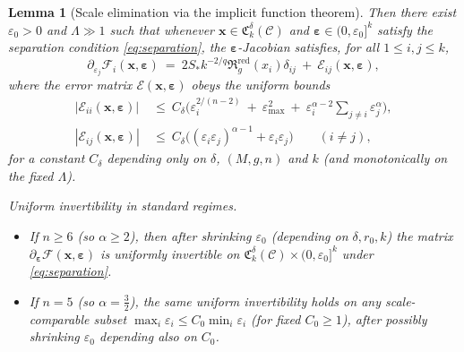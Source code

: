 \documentclass[11pt,reqno,a4paper]{amsart}
\numberwithin{equation}{section}
\theoremstyle{plain}
\newtheorem{lemma}[theorem]{Lemma}
\theoremstyle{remark}
\theoremstyle{plain}
\begin{document}
\begin{lemma}[Scale elimination via the implicit function theorem]
Then there exist $\varepsilon_0>0$ and $\Lambda\gg1$ such that whenever
$\mathbf x\in\mathfrak C_k^\delta(\mathcal C)$ and $\boldsymbol\varepsilon\in(0,\varepsilon_0]^k$ satisfy the
separation condition \eqref{eq:separation}, the $\boldsymbol\varepsilon$-Jacobian satisfies, for all $1\le i,j\le k$,
\begin{equation}\label{eq:scale-Jacobian-structure}
\partial_{\varepsilon_j}\mathcal F_i(\mathbf x,\boldsymbol\varepsilon)
\ =\ 2S_\ast k^{-2/q}\mathfrak R_g^{\mathrm{red}}(x_i)\delta_{ij}\ +\ \mathcal E_{ij}(\mathbf x,\boldsymbol\varepsilon),
\end{equation}
where the error matrix $\mathcal E(\mathbf x,\boldsymbol\varepsilon)$ obeys the uniform bounds
\begin{align}
|\mathcal E_{ii}(\mathbf x,\boldsymbol\varepsilon)|
&\ \le\ C_\delta\Big(\varepsilon_i^{2/(n-2)}\ +\ \varepsilon_{\max}^2\ +\ \varepsilon_i^{\alpha-2}\sum_{j\neq i}\varepsilon_j^{\alpha}\Big),
\label{eq:scale-Jacobian-diag}\\
|\mathcal E_{ij}(\mathbf x,\boldsymbol\varepsilon)|
&\ \le\ C_\delta\Big((\varepsilon_i\varepsilon_j)^{\alpha-1}+\varepsilon_i\varepsilon_j\Big)\qquad (i\neq j),
\label{eq:scale-Jacobian-off}
\end{align}
for a constant $C_\delta$ depending only on $\delta$, $(M,g,n)$ and $k$ (and monotonically on the fixed $\Lambda$).

\smallskip
\noindent\textup{Uniform invertibility in standard regimes.}
\begin{itemize}
\item If $n\ge6$ (so $\alpha\ge2$), then after shrinking $\varepsilon_0$ (depending on $\delta,r_0,k$)
the matrix $\partial_{\boldsymbol\varepsilon}\mathcal F(\mathbf x,\boldsymbol\varepsilon)$ is uniformly invertible on
$\mathfrak C_k^\delta(\mathcal C)\times(0,\varepsilon_0]^k$ under \eqref{eq:separation}.
\item If $n=5$ (so $\alpha=\tfrac32$), the same uniform invertibility holds on any scale-comparable subset
$\max_i\varepsilon_i\le C_0\min_i\varepsilon_i$ (for fixed $C_0\ge1$), after possibly shrinking $\varepsilon_0$
depending also on $C_0$.
\end{itemize}


\end{lemma}
\end{document}
